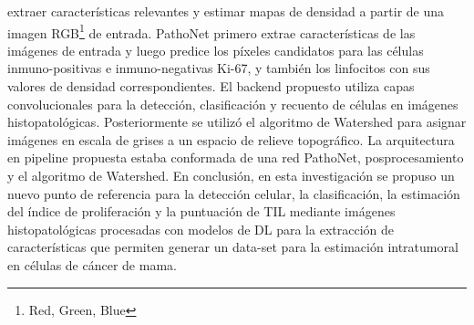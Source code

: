 extraer características relevantes y estimar mapas de densidad a partir de una imagen RGB\footnote{Red, Green, Blue} de entrada. PathoNet primero extrae características de las imágenes de entrada y luego predice los píxeles candidatos para las células inmuno-positivas e inmuno-negativas Ki-67, y también los linfocitos con sus valores de densidad correspondientes. El backend propuesto utiliza capas convolucionales para la detección, clasificación y recuento de células en imágenes histopatológicas. Posteriormente se utilizó el algoritmo de Watershed para asignar imágenes en escala de grises a un espacio de relieve topográfico. La arquitectura en pipeline propuesta estaba conformada de una red PathoNet, posprocesamiento y el algoritmo de Watershed. En conclusión, en esta investigación se propuso un nuevo punto de referencia para la detección celular, la clasificación, la estimación del índice de proliferación y la puntuación de TIL mediante imágenes histopatológicas procesadas con modelos de DL para la extracción de características que permiten generar un data-set para la estimación intratumoral en células de cáncer de mama.
